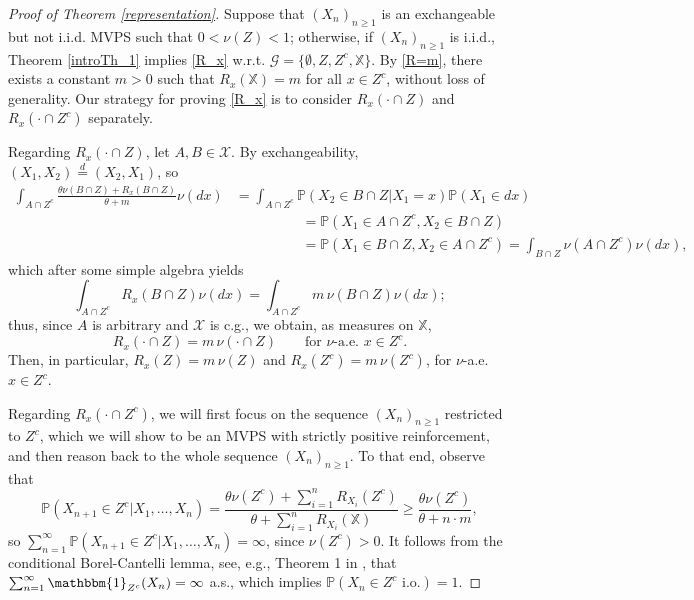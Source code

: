 \documentclass[a4paper]{article}
\theoremstyle{plain}
\theoremstyle{remark}
\theoremstyle{definition}
\begin{document}
\begin{proof}[Proof of Theorem \ref{representation}]
Suppose that $(X_n)_{n\geq1}$ is an exchangeable but not i.i.d. MVPS such that $0<\nu(Z)<1$; otherwise, if $(X_n)_{n\geq1}$ is i.i.d., Theorem \ref{introTh_1} implies \eqref{R_x} w.r.t. $\mathcal{G}=\{\emptyset,Z,Z^c,\mathbb{X}\}$. By \eqref{R=m}, there exists a constant $m>0$ such that $R_x(\mathbb{X})=m$ for all $x\in Z^c$, without loss of generality. Our strategy for proving \eqref{R_x} is to consider $R_x(\cdot\cap Z)$ and $R_x(\cdot\cap Z^c)$ separately. 

Regarding $R_x(\cdot\cap Z)$, let $A,B\in \mathcal{X}$. By exchangeability, $(X_1,X_2)\overset{d}{=}(X_2,X_1)$, so
\begingroup\allowdisplaybreaks
\begin{align*}
\int_{A\cap Z^c}\frac{\theta\nu(B\cap Z)+R_x(B\cap Z)}{\theta+m}\nu(dx)&=\int_{A\cap Z^c}\mathbb{P}(X_2\in B\cap Z|X_1=x)\mathbb{P}(X_1\in dx)\\
&\hspace{2cm}=\mathbb{P}(X_1\in A\cap Z^c,X_2\in B\cap Z)\\
&\hspace{2cm}=\mathbb{P}(X_1\in B\cap Z,X_2\in A\cap Z^c)=\int_{B\cap Z}\nu(A\cap Z^c)\nu(dx),
\end{align*}
\endgroup
which after some simple algebra yields
\[\int_{A\cap Z^c}R_x(B\cap Z)\nu(dx)=\int_{A\cap Z^c}m\,\nu(B\cap Z)\nu(dx);\]
thus, since $A$ is arbitrary and $\mathcal{X}$ is c.g., we obtain, as measures on $\mathbb{X}$,
\begin{equation}\label{representation:eq1}
R_x(\cdot \cap Z)=m\,\nu(\cdot\cap Z)\qquad\mbox{for }\nu\mbox{-a.e. }x\in Z^c.
\end{equation}
Then, in particular, $R_x(Z)=m\,\nu(Z)$ and $R_x(Z^c)=m\,\nu(Z^c)$, for $\nu$-a.e. $x\in Z^c$.

Regarding $R_x(\cdot\cap Z^c)$, we will first focus on the sequence $(X_n)_{n\geq1}$ restricted to $Z^c$, which we will show to be an MVPS with strictly positive reinforcement, and then reason back to the whole sequence $(X_n)_{n\geq1}$. To that end, observe that
\[\mathbb{P}(X_{n+1}\in Z^c|X_1,\ldots,X_n)=\frac{\theta\nu(Z^c)+\sum_{i=1}^nR_{X_i}(Z^c)}{\theta+\sum_{i=1}^nR_{X_i}(\mathbb{X})}\geq\frac{\theta\nu(Z^c)}{\theta+n\cdot m},\]
so $\sum_{n=1}^\infty\mathbb{P}(X_{n+1}\in Z^c|X_1,\ldots,X_n)=\infty$, since $\nu(Z^c)>0$. It follows from the conditional Borel-Cantelli lemma, see, e.g., Theorem 1 in \cite{dubins1965sharper}, that $\sum_{n=1}^\infty\mathbbm{1}_{Z^c}(X_n)=\infty$ a.s., which implies $\mathbb{P}(X_n\in Z^c\mbox{ i.o.})=1$.


\end{proof}
\end{document}
